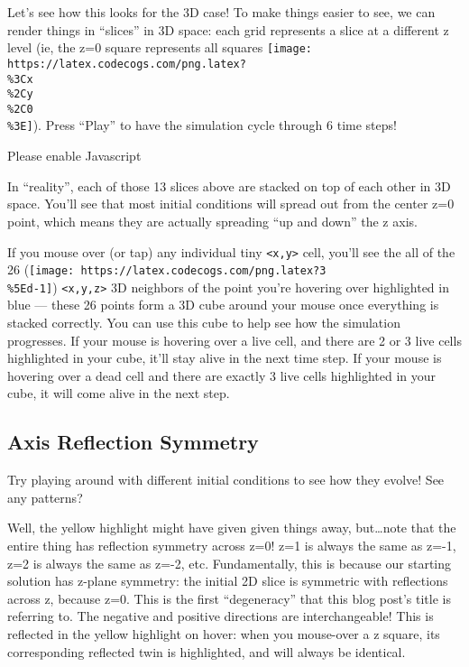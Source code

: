 \documentclass[]{article}
\begin{document}
Let's see how this looks for the 3D case! To make things easier to see, we can
render things in ``slices'' in 3D space: each grid represents a slice at a
different z level (ie, the z=0 square represents all squares
\texttt{[image: https://latex.codecogs.com/png.latex?\\\%3Cx\\\%2Cy\\\%2C0\\\%3E]}).
Press ``Play'' to have the simulation cycle through 6 time steps!

\leavevmode\hypertarget{gol3D}{}%
Please enable Javascript

In ``reality'', each of those 13 slices above are stacked on top of each other
in 3D space. You'll see that most initial conditions will spread out from the
center z=0 point, which means they are actually spreading ``up and down'' the z
axis.

If you mouse over (or tap) any individual tiny
\texttt{\textless{}x,y\textgreater{}} cell, you'll see the all of the 26
(\texttt{[image: https://latex.codecogs.com/png.latex?3\\\%5Ed-1]})
\texttt{\textless{}x,y,z\textgreater{}} 3D neighbors of the point you're
hovering over highlighted in blue --- these 26 points form a 3D cube around your
mouse once everything is stacked correctly. You can use this cube to help see
how the simulation progresses. If your mouse is hovering over a live cell, and
there are 2 or 3 live cells highlighted in your cube, it'll stay alive in the
next time step. If your mouse is hovering over a dead cell and there are exactly
3 live cells highlighted in your cube, it will come alive in the next step.

\hypertarget{axis-reflection-symmetry}{%
\subsection{Axis Reflection Symmetry}\label{axis-reflection-symmetry}}

Try playing around with different initial conditions to see how they evolve! See
any patterns?

Well, the yellow highlight might have given given things away, but\ldots note
that the entire thing has reflection symmetry across z=0! z=1 is always the same
as z=-1, z=2 is always the same as z=-2, etc. Fundamentally, this is because our
starting solution has z-plane symmetry: the initial 2D slice is symmetric with
reflections across z, because z=0. This is the first ``degeneracy'' that this
blog post's title is referring to. The negative and positive directions are
interchangeable! This is reflected in the yellow highlight on hover: when you
mouse-over a z square, its corresponding reflected twin is highlighted, and will
always be identical.
\end{document}
